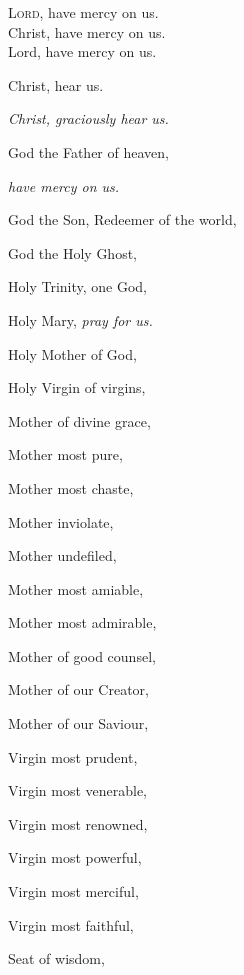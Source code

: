 
\newHymn


\pointorig

\bigskip

\begin{multicols}{2}

\lettrine{L}{ord,} have mercy on us.\\
Christ, have mercy on us.\\
Lord, have mercy on us.\\
\begin{hangparas}{1em}{1}
\parskip0mm
Christ, hear us.

{\itshape Christ, graciously hear us.}

God the Father of heaven,

{\itshape have mercy on us.}

God the Son, Redeemer of the world,

God the Holy Ghost,

Holy Trinity, one God,

Holy Mary, \textit{pray for us.}

Holy Mother of God,

Holy Virgin of virgins,



Mother of divine grace,

Mother most pure,

Mother most chaste,

Mother inviolate,

Mother undefiled,

Mother most amiable,

Mother most admirable,

Mother of good counsel,

Mother of our Creator,

Mother of our Saviour,

Virgin most prudent,

Virgin most venerable,

Virgin most renowned,

Virgin most powerful,

Virgin most merciful,

Virgin most faithful,


Seat of wisdom,


\end{hangparas}
\end{multicols}
